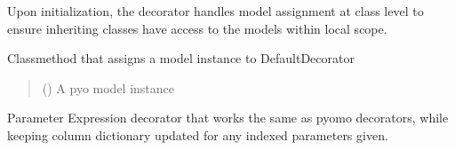 \documentclass[letterpaper,10pt,english]{sphinxmanual}
\begin{document}
\begin{fulllineitems}
\begin{fulllineitems}
\sphinxAtStartPar
Upon initialization, the decorator handles model assignment at class level to ensure
inheriting classes have access to the models within local scope.

\begin{fulllineitems}
\label{\detokenize{src.common.model:src.common.model.Model.DefaultDecorator.assign_model}}
\pysigstartsignatures
\pysiglinewithargsret
{}
{}
{}
\pysigstopsignatures
\sphinxAtStartPar
Class\sphinxhyphen{}method that assigns a model instance to DefaultDecorator
\begin{quote}\begin{description}
\sphinxAtStartPar
{} () \textendash{} A pyo model instance

\end{description}\end{quote}

\end{fulllineitems}


\end{fulllineitems}


\begin{fulllineitems}
\label{\detokenize{src.common.model:src.common.model.Model.ParameterExpression}}
\pysigstartsignatures
\pysiglinewithargsret
{}
{\sphinxparamcomma {}}
{}
\pysigstopsignatures
\sphinxAtStartPar
Parameter Expression decorator that works the same as pyomo decorators, while keeping
column dictionary updated for any indexed parameters given.

\end{fulllineitems}



\end{fulllineitems}
\end{document}
